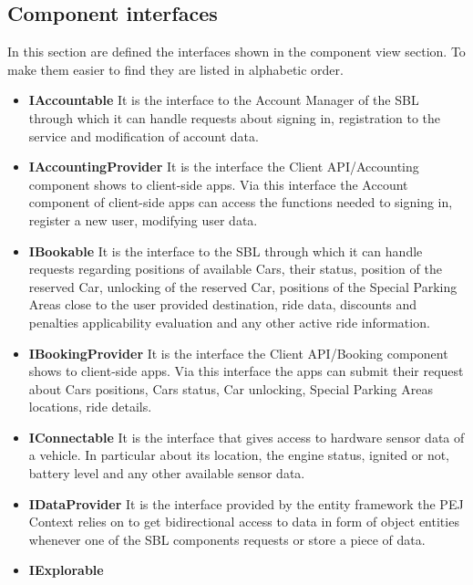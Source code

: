 \subsection{Component interfaces}
In this section are defined the interfaces shown in the component view section. To make them easier to find they are listed in alphabetic order.
\begin{itemize}
    \item\textbf{IAccountable}\newline
    It is the interface to the Account Manager of the SBL through which it can handle requests about signing in, registration to the service and modification of account data.
    \item\textbf{IAccountingProvider}\newline
    It is the interface the Client API/Accounting component shows to client-side apps. Via this interface the Account component of client-side apps can access the functions needed to signing in, register a new user, modifying user data.
    \item\textbf{IBookable}\newline
    It is the interface to the SBL through which it can handle requests regarding positions of available Cars, their status, position of the reserved Car, unlocking of the reserved Car, positions of the Special Parking Areas close to the user provided destination, ride data, discounts and penalties applicability evaluation and any other active ride information.
    \item\textbf{IBookingProvider}\newline
    It is the interface the Client API/Booking component shows to client-side apps. Via this interface the apps can submit their request about Cars positions, Cars status, Car unlocking, Special Parking Areas locations, ride details.
    \item\textbf{IConnectable}\newline
    It is the interface that gives access to hardware sensor data of a vehicle. In particular about its location, the engine status, ignited or not, battery level and any other available sensor data.
    \item\textbf{IDataProvider}\newline
    It is the interface provided by the entity framework the PEJ Context relies on to get bidirectional access to data in form of object entities whenever one of the SBL components requests or store a piece of data.
    \item\textbf{IExplorable}\newline

\end{itemize}
